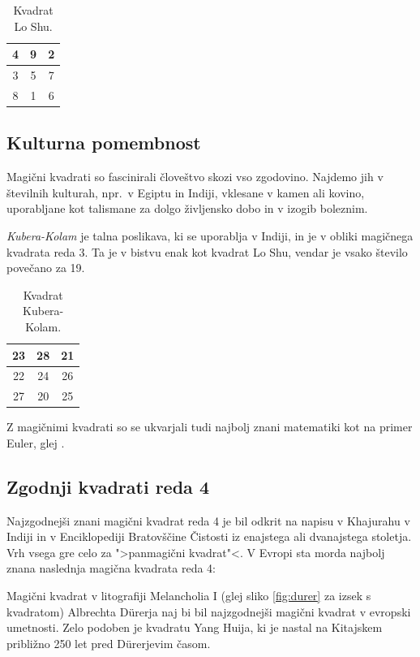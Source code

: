 \documentclass[a4paper,12pt]{article}
\theoremstyle{definition}
\theoremstyle{plain}
\newenvironment{magic}[3]{
   \begin{table}[h]
      \Large
      \centering
      \caption{#1}
      \label{#3}
      \begin{tabular}{|*{#2}{c|}}
         \hline
         }{
      \end{tabular}
   \end{table}
}
\newcommand{\pojem}[1]{\emph{\color{purple}#1}}
\begin{document}
\begin{magic}{Kvadrat Lo Shu.}{3}{table:loshu}
   4 & 9 & 2 \\\hline
   3 & 5 & 7 \\\hline
   8 & 1 & 6 \\\hline
\end{magic}



\subsection{Kulturna pomembnost}

Magični kvadrati so fascinirali človeštvo skozi vso zgodovino. Najdemo jih
v številnih kulturah, npr.\ v Egiptu in Indiji, vklesane v kamen ali
kovino, uporabljane kot talismane za dolgo življensko dobo in v
izogib boleznim.

\pojem{Kubera-Kolam} je talna poslikava, ki se uporablja v Indiji, in je v
obliki magičnega kvadrata reda 3. Ta je v bistvu enak kot kvadrat
Lo Shu, vendar je vsako število povečano za 19.



\begin{magic}{Kvadrat Kubera-Kolam.}{3}{table:kubera}
   23 & 28 & 21 \\\hline
   22 & 24 & 26 \\\hline
   27 & 20 & 25 \\\hline
\end{magic}


Z magičnimi kvadrati so se ukvarjali tudi najbolj znani matematiki kot na
primer Euler, glej \cite{euler}. %


\subsection{Zgodnji kvadrati reda 4}

Najzgodnejši znani magični kvadrat reda 4 je bil odkrit na napisu
v Khajurahu v Indiji in v Enciklopediji Bratovščine Čistosti iz enajstega
ali dvanajstega stoletja. Vrh vsega gre celo za ">panmagični kvadrat"<.
V Evropi sta morda najbolj znana naslednja magična kvadrata reda 4:

Magični kvadrat v litografiji Melancholia I (glej sliko \ref{fig:durer}
za izsek s kvadratom) Albrechta Dürerja naj bi bil najzgodnejši magični kvadrat
v evropski umetnosti. Zelo podoben je kvadratu Yang Huija, ki je nastal na Kitajskem
približno 250 let pred Dürerjevim časom. %
\end{document}
